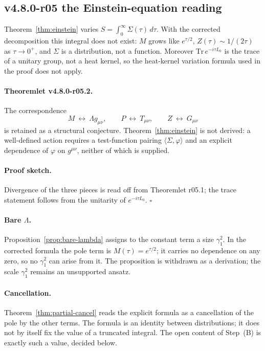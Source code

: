 \subsection*{v4.8.0-r05 the Einstein-equation reading}
\label{subsec:v480-r05-einstein-reading}

Theorem~\ref{thm:einstein} varies \(S=\int_0^\infty\Sigma(\tau)\,d\tau\).  With the corrected
decomposition this integral does not exist: \(M\) grows like \(e^{\tau/2}\), \(Z(\tau)\sim1/(2\tau)\)
as \(\tau\to0^+\), and \(\Sigma\) is a distribution, not a function.  Moreover
\(\mathrm{Tr}\,e^{-i\tau L_0}\) is the trace of a unitary group, not a heat kernel, so the heat-kernel
variation formula used in the proof does not apply.

\paragraph{Theoremlet v4.8.0-r05.2.}
The correspondence
\[
M\ \leftrightarrow\ \Lambda g_{\mu\nu},\qquad
P\ \leftrightarrow\ T_{\mu\nu},\qquad
Z\ \leftrightarrow\ G_{\mu\nu}
\]
is retained as a structural conjecture.  Theorem~\ref{thm:einstein} is not derived: a well-defined
action requires a test-function pairing \(\langle\Sigma,\varphi\rangle\) and an explicit dependence
of \(\varphi\) on \(g^{\mu\nu}\), neither of which is supplied.

\paragraph{Proof sketch.}
Divergence of the three pieces is read off from Theoremlet r05.1; the trace statement follows
from the unitarity of \(e^{-i\tau L_0}\).  \(\square\)

\paragraph{Bare \(\Lambda\).}
Proposition~\ref{prop:bare-lambda} assigns to the constant term a size \(\gamma_1^2\).  In the corrected
formula the pole term is \(M(\tau)=e^{\tau/2}\); it carries no dependence on any zero, so no
\(\gamma_1^2\) can arise from it.  The proposition is withdrawn as a derivation; the scale
\(\gamma_1^2\) remains an unsupported ansatz.

\paragraph{Cancellation.}
Theorem~\ref{thm:partial-cancel} reads the explicit formula as a cancellation of the pole by the
other terms.  The formula is an identity between distributions; it does not by itself fix the value
of a truncated integral.  The open content of Step~(B) is exactly such a value, decided below.

